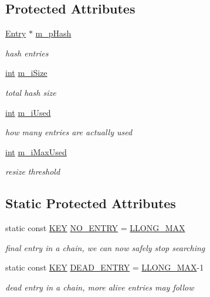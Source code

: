 \subsection*{Protected Attributes}
\begin{DoxyCompactItemize}
\item 
\hyperlink{structCSphHash_1_1Entry}{Entry} $\ast$ \hyperlink{classCSphHash_a554d27a66fb80b17c58073bcf231fa44}{m\-\_\-p\-Hash}
\begin{DoxyCompactList}\small\item\em hash entries \end{DoxyCompactList}\item 
\hyperlink{sphinxexpr_8cpp_a4a26e8f9cb8b736e0c4cbf4d16de985e}{int} \hyperlink{classCSphHash_aa663254fba48d19d48fdbcf26efe3c0b}{m\-\_\-i\-Size}
\begin{DoxyCompactList}\small\item\em total hash size \end{DoxyCompactList}\item 
\hyperlink{sphinxexpr_8cpp_a4a26e8f9cb8b736e0c4cbf4d16de985e}{int} \hyperlink{classCSphHash_a9be7c076d19b413992a1ce0ebb724476}{m\-\_\-i\-Used}
\begin{DoxyCompactList}\small\item\em how many entries are actually used \end{DoxyCompactList}\item 
\hyperlink{sphinxexpr_8cpp_a4a26e8f9cb8b736e0c4cbf4d16de985e}{int} \hyperlink{classCSphHash_aa9d82d8b942bfd6108f13846572f5fd1}{m\-\_\-i\-Max\-Used}
\begin{DoxyCompactList}\small\item\em resize threshold \end{DoxyCompactList}\end{DoxyCompactItemize}
\subsection*{Static Protected Attributes}
\begin{DoxyCompactItemize}
\item 
static const \hyperlink{classCSphHash_a59a1412d2e0498b2a7417c7adf5d7041}{K\-E\-Y} \hyperlink{classCSphHash_ac7c493907a5d923843f40bc427182589}{N\-O\-\_\-\-E\-N\-T\-R\-Y} = \hyperlink{sphinxint_8h_a23ec2cf7fc07ea8f817bbac758402baf}{L\-L\-O\-N\-G\-\_\-\-M\-A\-X}
\begin{DoxyCompactList}\small\item\em final entry in a chain, we can now safely stop searching \end{DoxyCompactList}\item 
static const \hyperlink{classCSphHash_a59a1412d2e0498b2a7417c7adf5d7041}{K\-E\-Y} \hyperlink{classCSphHash_ae7e4a4425e2b293824eb2e243c829a6d}{D\-E\-A\-D\-\_\-\-E\-N\-T\-R\-Y} = \hyperlink{sphinxint_8h_a23ec2cf7fc07ea8f817bbac758402baf}{L\-L\-O\-N\-G\-\_\-\-M\-A\-X}-\/1
\begin{DoxyCompactList}\small\item\em dead entry in a chain, more alive entries may follow \end{DoxyCompactList}\end{DoxyCompactItemize}


